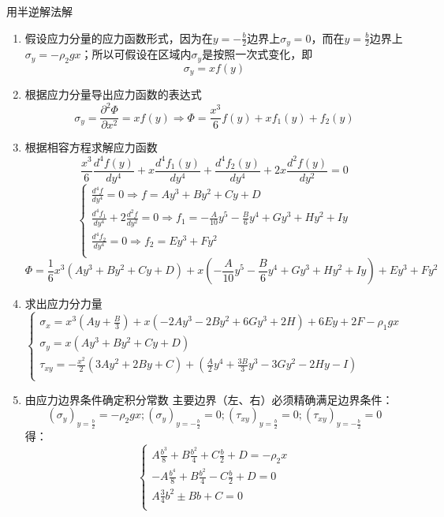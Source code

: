 \begin{remark}
用半逆解法解
\begin{enumerate}
	\item 假设应力分量的应力函数形式，因为在$y=-\frac{b}{2}$边界上$\sigma _y=0$，而在$y=\frac{b}{2}$边界上$\sigma _y=-\rho _2gx$；所以可假设在区域内$\sigma _y$是按照一次式变化，即\[\sigma _y=xf\left( y \right) \]
	\item 根据应力分量导出应力函数的表达式\[\sigma _y=\frac{\partial ^2\varPhi}{\partial x^2}=xf\left( y \right) \Longrightarrow \varPhi =\frac{x^3}{6}f\left( y \right) +xf_1\left( y \right) +f_2\left( y \right) \]
	\item 根据相容方程求解应力函数\[\frac{x^3}{6}\frac{d^4f\left( y \right)}{dy^4}+x\frac{d^4f_1\left( y \right)}{dy^4}+\frac{d^4f_2\left( y \right)}{dy^4}+2x\frac{d^2f\left( y \right)}{dy^2}=0\]
	\[\begin{cases}
	\frac{d^4f}{dy^4}=0\Longrightarrow f=Ay^3+By^2+Cy+D\\
	\frac{d^4f_1}{dy^4}+2\frac{d^2f}{dy^2}=0\Longrightarrow f_1=-\frac{A}{10}y^5-\frac{B}{6}y^4+Gy^3+Hy^2+Iy\\
	\frac{d^4f_2}{dy^4}=0\Longrightarrow f_2=Ey^3+Fy^2\\
	\end{cases}\]
	\[\varPhi =\frac{1}{6}x^3\left( Ay^3+By^2+Cy+D \right) +x\left( -\frac{A}{10}y^5-\frac{B}{6}y^4+Gy^3+Hy^2+Iy \right) +Ey^3+Fy^2\]
	\[\]
	\item 求出应力分力量\[\begin{cases}
	\sigma _x=x^3\left( Ay+\frac{B}{3} \right) +x\left( -2Ay^3-2By^2+6Gy^3+2H \right) +6Ey+2F-\rho _1gx\\
	\sigma _y=x\left( Ay^3+By^2+Cy+D \right)\\
	\tau _{xy}=-\frac{x^2}{2}\left( 3Ay^2+2By+C \right) +\left( \frac{A}{2}y^4+\frac{3B}{3}y^3-3Gy^2-2Hy-I \right)\\
	\end{cases}\]
	\item 由应力边界条件确定积分常数
	主要边界（左、右）必须精确满足边界条件：\[\left( \sigma _y \right) _{y=\frac{b}{2}}=-\rho _2gx;\left( \sigma _y \right) _{y=-\frac{b}{2}}=0;\left( \tau _{xy} \right) _{y=\frac{b}{2}}=0;\left( \tau _{xy} \right) _{y=-\frac{b}{2}}=0\]
	得：\[\begin{cases}
	A\frac{b^3}{8}+B\frac{b^2}{4}+C\frac{b}{2}+D=-\rho _2x\\
	-A\frac{b^4}{8}+B\frac{b^2}{4}-C\frac{b}{2}+D=0\\
	A\frac{3}{4}b^2\pm Bb+C=0\\

\end{cases}\]
\end{enumerate}
\end{remark}

